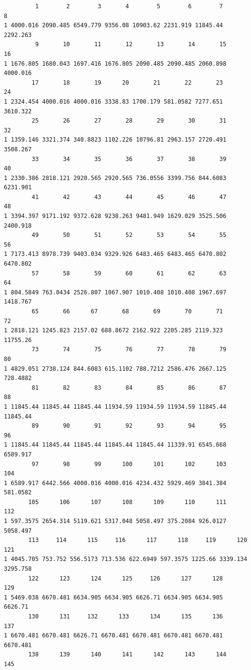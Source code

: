 \documentclass[
  letterpaper,
  DIV=11,
  numbers=noendperiod]{scrreprt}
\begin{document}
\begin{verbatim}
         1        2        3       4        5        6        7        8
1 4000.016 2090.485 6549.779 9356.08 10903.62 2231.919 11845.44 2292.263
         9       10       11       12       13       14       15       16
1 1676.805 1680.043 1697.416 1676.805 2090.485 2090.485 2060.898 4000.016
        17       18       19      20       21       22       23       24
1 2324.454 4000.016 4000.016 3338.83 1700.179 581.0582 7277.651 3610.322
        25       26       27       28       29       30       31       32
1 1359.146 3321.374 340.8823 1102.226 10796.81 2963.157 2720.491 3508.267
        33       34       35       36       37       38       39       40
1 2330.386 2818.121 2920.565 2920.565 736.0556 3399.756 844.6083 6231.901
        41       42       43       44       45       46       47       48
1 3394.397 9171.192 9372.628 9238.263 9481.949 1629.029 3525.506 2400.918
        49       50       51       52       53       54       55       56
1 7173.413 8978.739 9403.034 9329.926 6483.465 6483.465 6470.802 6470.802
        57       58       59       60       61       62       63       64
1 804.5849 763.0434 2526.807 1067.907 1010.408 1010.408 1967.697 1418.767
        65       66      67       68       69       70       71       72
1 2818.121 1245.823 2157.02 688.8672 2162.922 2205.285 2119.323 11755.26
        73       74       75       76       77       78       79       80
1 4829.051 2738.124 844.6083 615.1102 788.7212 2586.476 2667.125 728.4882
        81       82       83       84       85       86       87       88
1 11845.44 11845.44 11845.44 11934.59 11934.59 11934.59 11845.44 11845.44
        89       90       91       92       93       94       95       96
1 11845.44 11845.44 11845.44 11845.44 11845.44 11339.91 6545.668 6589.917
        97       98       99      100      101      102      103      104
1 6589.917 6442.566 4000.016 4000.016 4234.432 5929.469 3841.384 581.0582
       105      106      107      108      109      110      111      112
1 597.3575 2654.314 5119.621 5317.048 5058.497 375.2084 926.0127 5058.497
       113     114      115     116      117      118     119      120      121
1 4045.705 753.752 556.5173 713.536 622.6949 597.3575 1225.66 3339.134 3295.758
       122      123      124      125     126      127      128     129
1 5469.038 6670.481 6634.905 6634.905 6626.71 6634.905 6634.905 6626.71
       130      131     132      133      134      135      136      137
1 6670.481 6670.481 6626.71 6670.481 6670.481 6670.481 6670.481 6670.481
       138      139      140      141      142      143      144      145

\end{verbatim}
\end{document}
